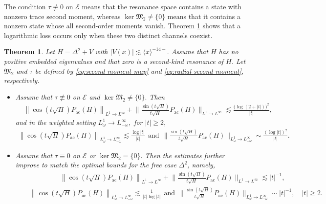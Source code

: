 \documentclass[reqno]{amsart}
\newtheorem{theorem}{Theorem}[section]
\numberwithin{equation}{section}
\begin{document}
The condition
$
\tau\not\equiv0
$ on $\mathcal{E}$
means that the resonance space contains a state with nonzero trace
second moment, whereas
$
\ker\mathfrak{M}_2\neq\{0\}
$
means that it contains a nonzero state whose  all second-order moments 
vanish.
 Theorem \ref{main_theorem-2} shows that
a logarithmic loss occurs only when these two distinct channels
coexist. 

\begin{theorem}\label{main_theorem-2}
	Let $H=\Delta^2+V$ with
	$
	|V(x)|
	\lesssim
	\langle x\rangle^{-14-}.
	$
	Assume that $H$ has no positive embedded eigenvalues and that zero
	is a second-kind resonance of $H$. Let $\mathfrak{M}_2$ and $\tau$
	be defined by \eqref{eq:second-moment-map} and
	\eqref{eq:radial-second-moment}, respectively.
	
	\begin{itemize}
		\item[(i)]
		Assume that
	$\tau\not\equiv0$
			on $\mathcal{E}$ and $
			\ker\mathfrak{M}_2\neq\{0\}.$
		Then 
	\begin{align}\label{log-cos-sin}
			&
			\left\|
			\cos(t\sqrt H)P_{\mathrm{ac}}(H)
			\right\|_{L^1\to L^\infty}
			+
			\bigg\|
			\frac{\sin(t\sqrt H)}{t\sqrt H}
			P_{\mathrm{ac}}(H)
			\bigg\|_{L^1\to L^\infty}
			\lesssim
			\frac{\bigl(\log(2+|t|)\bigr)^2}{|t|},\end{align}
            and in the weighted setting $L^1_\omega\to L^\infty_{-\omega},$ for $|t|\geq 2,$
            \begin{align*}
		\left\|
			\cos(t\sqrt H)P_{\mathrm{ac}}(H)
			\right\|_{L^1_\omega\to L^\infty_{-\omega}}\lesssim \frac{\log|t|}{|t|}\ \ \text{and} \ \ \bigg\|
		\frac{\sin(t\sqrt H)}{t\sqrt H}
			P_{\mathrm{ac}}(H)
			\bigg\|_{L^1_\omega\to L^\infty_{-\omega}}
			\sim
			\frac{(\log|t|)^2}{|t|}. 
		\end{align*}
		
		\item[(ii)]
		Assume that
			$\tau\equiv0$
			on $\mathcal{E}$
			or
			$\ker\mathfrak{M}_2=\{0\}.$
	Then   
	the  estimates further improve to match the optimal bounds for the free case $\Delta^2$, namely,  
	\begin{align}  
		&\ \ \ \ \ \ \ \ \ \ \ \ \ \ \  \ \  \ \ \ \  \ \ \  \left\| \cos (t \sqrt{H})  P_{\mathrm{ac}}(H)\right\|_{L^1 \to L^{\infty}} +  
		\bigg\|\frac{\sin (t \sqrt{H})}{t\sqrt{H}} P_{\mathrm{ac}}(H)\bigg\|_{L^1 \to L^{\infty}} \lesssim |t|^{-1}, \nonumber \\
		\label{2-best}  
		& \ \ \ \ \left \|\cos (t \sqrt{H}) P_{\mathrm{ac}}(H)\right\|_{L^1_\omega\to L^\infty_{-\omega}} \lesssim\frac{1}{|t|\log |t|}\ \ \text{and}\ \ \bigg\|\frac{\sin (t \sqrt{H})}{t\sqrt{H}} P_{\mathrm{ac}}(H)\bigg\|_{L^1_\omega\to L^\infty_{-\omega}}\sim|t|^{-1}, \quad |t| \ge 2.    
	\end{align} 
	\end{itemize}
\end{theorem}
\end{document}
